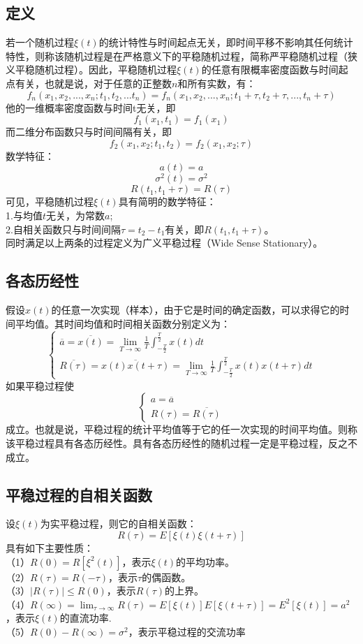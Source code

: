 \documentclass[12pt,a4paper,oneside]{ctexart}
\begin{document}
\subsection{定义}
若一个随机过程$\xi(t)$的统计特性与时间起点无关，即时间平移不影响其任何统计特性，则称该随机过程是在严格意义下的平稳随机过程，简称严平稳随机过程（狭义平稳随机过程）。因此，平稳随机过程$\xi(t)$的任意有限概率密度函数与时间起点有关，也就是说，对于任意的正整数$n$和所有实数，有：
$$
f_{n}(x_{1},x_{2},...,x_{n};t_{1},t_{2},...t_{n}) = f_{n}(x_{1},x_{2},...,x_{n};t_{1} + \tau, t_{2} + \tau,...,t_{n} + \tau)
$$
他的一维概率密度函数与时间t无关，即
$$
    f_{1}(x_{1},t_{1}) = f_{1}(x_{1})
$$
而二维分布函数只与时间间隔有关，即
$$
    f_{2}(x_{1},x_{2};t_{1},t_{2}) = f_{2}(x_{1},x_{2};\tau)
$$
数学特征：
$$
    a(t) = a
$$
$$
    \sigma^{2}(t) = \sigma^{2}
$$
$$
    R(t_{1},t_{1} + \tau) = R(\tau)
$$
可见，平稳随机过程$\xi(t)$具有简明的数学特征：\\
1.与均值$t$无关，为常数$a$;\\
2.自相关函数只与时间间隔$\tau = t_{2} - t_{1}$有关，即$R(t_{1},t_{1} + \tau)$。\\
同时满足以上两条的过程定义为广义平稳过程（Wide Sense Stationary）。
\subsection{各态历经性}
假设$x(t)$的任意一次实现（样本），由于它是时间的确定函数，可以求得它的时间平均值。其时间均值和时间相关函数分别定义为：
$$
\left\{\begin{matrix}\overline{a}  =  \overline{x(t)}  = \lim_{T \to \infty}\frac{1}{T}\int_{-\frac{T}{2}}^{\frac{T}{2}} x(t)dt
    \\\overline{R(\tau )} = \overline{x(t)x(t+\tau )} = \lim_{T \to \infty }\frac{1}{T}\int_{-\frac{T}{2} }^{\frac{T}{2} }x(t)x(t+\tau )dt     
    \end{matrix}\right.
$$
如果平稳过程使
$$
\left\{\begin{matrix}a = \overline{a} 
    \\R(\tau ) = \overline{R(\tau) } 
   \end{matrix}\right.
$$
成立。也就是说，平稳过程的统计平均值等于它的任一次实现的时间平均值。则称该平稳过程具有各态历经性。具有各态历经性的随机过程一定是平稳过程，反之不成立。
\subsection{平稳过程的自相关函数}
设$\xi(t)$为实平稳过程，则它的自相关函数：
$$
   R(\tau) = E[\xi(t)\xi(t + \tau)]
$$
具有如下主要性质：\\
（1）$R(0) = R[\xi^{2}(t)]$，表示$\xi(t)$的平均功率。\\
（2）$R(\tau) = R(-\tau)$，表示$\tau$的偶函数。\\
（3）$|R(\tau)|\le R(0)$，表示$R(\tau)$的上界。\\
（4）$R(\infty) = \lim_{\tau \to \infty}R(\tau) = E[\xi(t)]E[\xi(t + \tau)] = E^{2}[\xi(t)] = a^{2}$，表示$\xi(t)$的直流功率.\\
（5）$R(0) - R(\infty) = \sigma^{2}$，表示平稳过程的交流功率
\end{document}
